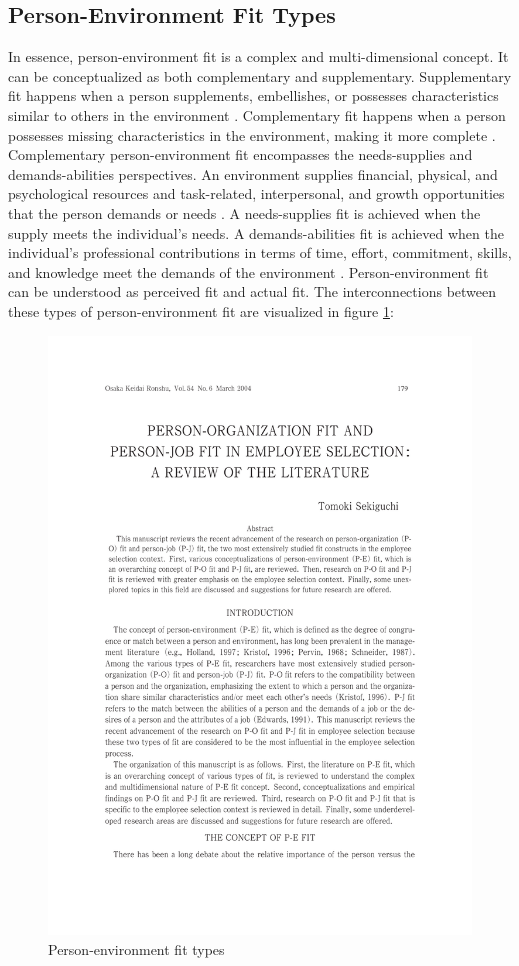 \documentclass[draft,final]{thesisclass} %
\begin{document}
\subsection{Person-Environment Fit Types} \label{pef_types}
In essence, person-environment fit is a complex and multi-dimensional concept.
It can be conceptualized as both complementary and supplementary. 
Supplementary fit happens when a person supplements, embellishes, or possesses characteristics similar to others in the environment \parencite[180]{po_and_pj_fit_literature_review}.
Complementary fit happens when a person possesses missing characteristics in the environment, making it more complete \parencite[180]{po_and_pj_fit_literature_review}.
Complementary person-environment fit encompasses the needs-supplies and demands-abilities perspectives. 
An environment supplies financial, physical, and psychological resources and task-related, interpersonal, and growth opportunities that the person demands or needs \parencite[180]{po_and_pj_fit_literature_review}.
A needs-supplies fit is achieved when the supply meets the individual's needs.
A demands-abilities fit is achieved when the individual's professional contributions in terms of time, effort, commitment, skills, and knowledge meet the demands of the environment \parencite[180]{po_and_pj_fit_literature_review}.
Person-environment fit can be understood as perceived fit and actual fit.
The interconnections between these types of person-environment fit are visualized in figure \ref{fig:person_environment_fit_types}:
\begin{figure}[H]
    \centering
    \includegraphics[scale=0.5,page=3,width=0.8\linewidth,trim={55 130 55 470},clip]{literature/po_and_pj_fit_literature_review.pdf}
    \caption{Person-environment fit types \parencite[3]{po_and_pj_fit_literature_review}}
    \label{fig:person_environment_fit_types}
\end{figure}
\end{document}
